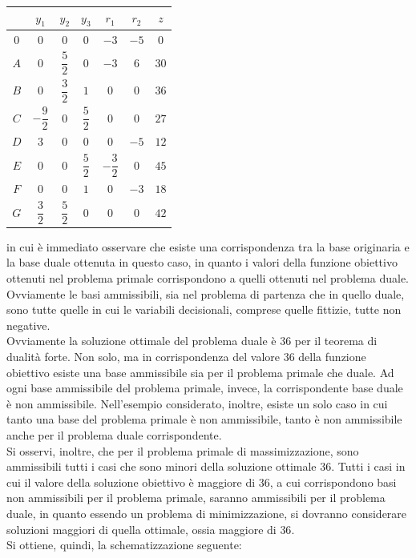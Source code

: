 \documentclass[a4paper]{extarticle}
\renewcommand\arraystretch{}
\begin{document}
\vspace{1em}
\noindent
\begin{table}[H]
    \setlength{\tabcolsep}{8pt}
    \renewcommand{\arraystretch}{1.5}
    \noindent
    \centering
    \begin{tabular}{c|ccccc|c}
         & $y_1$ & $y_2$ & $y_3$ & $r_1$ & $r_2$ & $z$\\
        \hline
        $0$ & $0$ & $0$ & $0$ & $-3$ & $-5$ & $0$\\
        $A$ & $0$ & $\dfrac{5}{2}$ & $0$ & $-3$ & $6$ & $30$\\
        $B$ & $0$ & $\dfrac{3}{2}$ & $1$ & $0$ & $0$ & $36$\\
        $C$ & $-\dfrac{9}{2}$ & $0$ & $\dfrac{5}{2}$ & $0$ & $0$ & $27$\\
        $D$ & $3$ & $0$ & $0$ & $0$ & $-5$ & $12$\\
        $E$ & $0$ & $0$ & $\dfrac{5}{2}$ & $-\dfrac{3}{2}$ & $0$ & $45$\\
        $F$ & $0$ & $0$ & $1$ & $0$ & $-3$ & $18$\\
        $G$ & $\dfrac{3}{2}$ & $\dfrac{5}{2}$ & $0$ & $0$ & $0$ & $42$\\
    \end{tabular}
\end{table}

\vspace{1em}
\noindent
in cui è immediato osservare che esiste una corrispondenza tra la base originaria e la base duale ottenuta in questo caso, in quanto i valori della funzione obiettivo ottenuti nel problema primale corrispondono a quelli ottenuti nel problema duale.\\
Ovviamente le basi ammissibili, sia nel problema di partenza che in quello duale, sono tutte quelle in cui le variabili decisionali, comprese quelle fittizie, tutte non negative.\\
Ovviamente la soluzione ottimale del problema duale è $36$ per il teorema di dualità forte. Non solo, ma in corrispondenza del valore $36$ della funzione obiettivo esiste una base ammissibile sia per il problema primale che duale. Ad ogni base ammissibile del problema primale, invece, la corrispondente base duale è non ammissibile. Nell'esempio considerato, inoltre, esiste un solo caso in cui tanto una base del problema primale è non ammissibile, tanto è non ammissibile anche per il problema duale corrispondente.\\
Si osservi, inoltre, che per il problema primale di massimizzazione, sono ammissibili tutti i casi che sono minori della soluzione ottimale $36$. Tutti i casi in cui il valore della soluzione obiettivo è maggiore di $36$, a cui corrispondono basi non ammissibili per il problema primale, saranno ammissibili per il problema duale, in quanto essendo un problema di minimizzazione, si dovranno considerare soluzioni maggiori di quella ottimale, ossia maggiore di $36$.\\
Si ottiene, quindi, la schematizzazione seguente:
\end{document}
